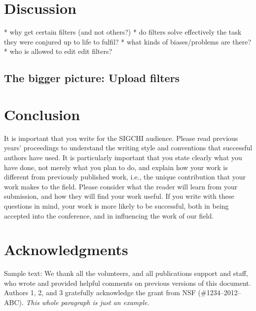 \documentclass{sigchi}
\begin{document}
\section{Discussion}

* why get certain filters (and not others?)
* do filters solve effectively the task they were conjured up to life to fulfil?
* what kinds of biases/problems are there?
* who is allowed to edit edit filters?

\subsection{The bigger picture: Upload filters}

\section{Conclusion}

It is important that you write for the SIGCHI audience. Please read
previous years' proceedings to understand the writing style and
conventions that successful authors have used. It is particularly
important that you state clearly what you have done, not merely what
you plan to do, and explain how your work is different from previously
published work, i.e., the unique contribution that your work makes to
the field. Please consider what the reader will learn from your
submission, and how they will find your work useful. If you write with
these questions in mind, your work is more likely to be successful,
both in being accepted into the conference, and in influencing the
work of our field.

\section{Acknowledgments}

Sample text: We thank all the volunteers, and all publications support
and staff, who wrote and provided helpful comments on previous
versions of this document. Authors 1, 2, and 3 gratefully acknowledge
the grant from NSF (\#1234--2012--ABC). \textit{This whole paragraph is
  just an example.}

%
%
%
%
%
\balance{}

\balance{}



\end{document}
